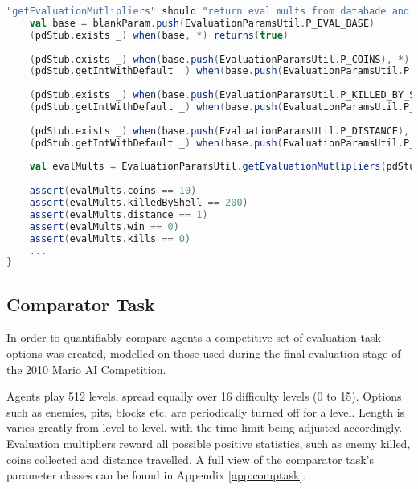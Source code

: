 \begin{minipage}{0.9\linewidth}
\centering
\begin{lstlisting}[language=scala]
"getEvaluationMutlipliers" should "return eval mults from databade and zero otherwise" in {
    val base = blankParam.push(EvaluationParamsUtil.P_EVAL_BASE)
    (pdStub.exists _) when(base, *) returns(true)
    
    (pdStub.exists _) when(base.push(EvaluationParamsUtil.P_COINS), *) returns(true)
    (pdStub.getIntWithDefault _) when(base.push(EvaluationParamsUtil.P_COINS), *, *) returns(10)
    
    (pdStub.exists _) when(base.push(EvaluationParamsUtil.P_KILLED_BY_SHELL), *) returns(true)
    (pdStub.getIntWithDefault _) when(base.push(EvaluationParamsUtil.P_KILLED_BY_SHELL), *, *) returns(200)
    
    (pdStub.exists _) when(base.push(EvaluationParamsUtil.P_DISTANCE), *) returns(true)
    (pdStub.getIntWithDefault _) when(base.push(EvaluationParamsUtil.P_DISTANCE), *, *) returns(1)
    
    val evalMults = EvaluationParamsUtil.getEvaluationMutlipliers(pdStub, base);
    
    assert(evalMults.coins == 10)
    assert(evalMults.killedByShell == 200)
    assert(evalMults.distance == 1)
    assert(evalMults.win == 0)
    assert(evalMults.kills == 0)
    ...
}

\end{lstlisting}
\end{minipage}



\subsection{Comparator Task}
\label{subsec:comptask}

In order to quantifiably compare agents a competitive set of evaluation task options was created, modelled on those used during the final evaluation stage of the 2010 Mario AI Competition.

Agents play 512 levels, spread equally over 16 difficulty levels (0 to 15). Options such as enemies, pits, blocks etc. are periodically turned off for a level. Length is varies greatly from level to level, with the time-limit being adjusted accordingly. Evaluation multipliers reward all possible positive statistics, such as enemy killed, coins collected and distance travelled. A full view of the comparator task's parameter classes can be found in Appendix \ref{app:comptask}.

